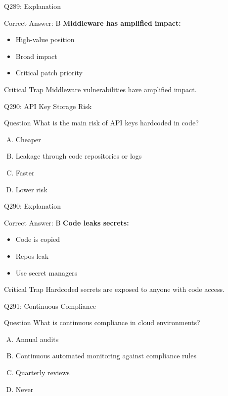 \documentclass{beamer}
\begin{document}
	\begin{frame}{Q289: Explanation}
		\begin{block}{Correct Answer: B}
			\textbf{Middleware has amplified impact:}
			\begin{itemize}
				\item High-value position
				\item Broad impact
				\item Critical patch priority
			\end{itemize}
		\end{block}
		\begin{alertblock}{Critical Trap}
			Middleware vulnerabilities have amplified impact.
		\end{alertblock}
	\end{frame}
	
	\begin{frame}{Q290: API Key Storage Risk}
		\begin{block}{Question}
			What is the main risk of API keys hardcoded in code?
		\end{block}
		\begin{enumerate}[(A)]
			\item Cheaper
			\item Leakage through code repositories or logs
			\item Faster
			\item Lower risk
		\end{enumerate}
	\end{frame}
	
	\begin{frame}{Q290: Explanation}
		\begin{block}{Correct Answer: B}
			\textbf{Code leaks secrets:}
			\begin{itemize}
				\item Code is copied
				\item Repos leak
				\item Use secret managers
			\end{itemize}
		\end{block}
		\begin{alertblock}{Critical Trap}
			Hardcoded secrets are exposed to anyone with code access.
		\end{alertblock}
	\end{frame}
	
	\begin{frame}{Q291: Continuous Compliance}
		\begin{block}{Question}
			What is continuous compliance in cloud environments?
		\end{block}
		\begin{enumerate}[(A)]
			\item Annual audits
			\item Continuous automated monitoring against compliance rules
			\item Quarterly reviews
			\item Never
		\end{enumerate}
	\end{frame}
	
\end{document}
